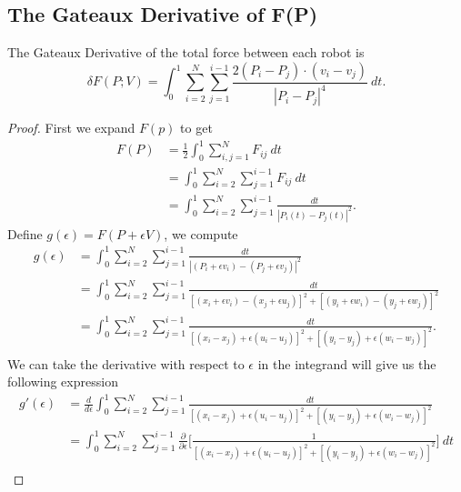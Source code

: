 \subsection{The Gateaux Derivative of F(P)}

\begin{prop}
    The Gateaux Derivative of the total force between each robot is
    \[  \delta F(P;V) = \int_{0}^{1} \sum_{i=2}^{N} \sum_{j=1}^{i-1} \frac{2(P_i - P_j) \cdot (v_i - v_j)}{| P_i - P_j|^4} \ dt. \]
\end{prop}

\begin{proof}
First we expand \( F(p)  \) to get
\begin{align*}
    F(P) &= \frac{ 1 }{ 2 }  \int_{ 0 }^{ 1 } \sum_{ i,j = 1  }^{ N } F_{ij} \ dt \\
         &= \int_{ 0 }^{ 1 } \sum_{ i=2 }^{ N } \sum_{ j=1 }^{ i-1 } F_{ij} \ dt \\
         &= \int_{ 0 }^{ 1 } \sum_{ i=2 }^{ N } \sum_{ j=1 }^{ i-1 } \frac{ dt }{ | P_{i}(t) - P_{j }(t) |^{2}  }.
\end{align*}
Define \( g(\epsilon ) = F(P+\epsilon V)  \), we compute 
\begin{align*}
    g(\epsilon )&= \int_{ 0 }^{ 1 } \sum_{ i=2 }^{ N }\sum_{ j=1 }^{ i-1 } \frac{ dt }{ | (P_{i} + \epsilon v_{i} ) - (P_{j } + \epsilon v_{j }) | ^{2} } \\
                &= \int_{ 0 }^{ 1 } \sum_{ i=2 }^{ N } \sum_{ j=1 }^{ i-1 } \frac{ dt }{ [(x_{i} + \epsilon v_{i}) - (x_{j } + \epsilon u_{j} )]^{2} + [(y_{i} + \epsilon w_{i} ) - (y_{j} + \epsilon w_{j})]^{2}}   \\
                &= \int_{ 0 }^{ 1 } \sum_{ i=2 }^{ N } \sum_{ j=1 }^{ i-1 } \frac{ dt }{ [(x_{i} - x_{j }) + \epsilon (u_{i} - u_{j })]^{2} + [(y_{i} - y_{j}) + \epsilon (w_{i} - w_{j})]^{2}  }. \\
\end{align*}
We can take the derivative with respect to \( \epsilon  \) in the integrand will give us the following expression
\begin{align*}
    g'(\epsilon )&= \frac{ d }{ d \epsilon  }  \int_{ 0 }^{ 1 }  \sum_{ i=2 }^{ N } \sum_{ j=1 }^{ i-1 } \frac{ dt }{ [(x_{i} - x_{j}  ) + \epsilon (u_{i} - u_{j} )]^{2} + [(y_{i} - y_{j} ) + \epsilon (w_{i} - w_{j})]^{2} } \\
                 &= \int_{ 0 }^{ 1 } \sum_{ i=2 }^{ N } \sum_{ j=1 }^{ i-1 }    
    \frac{\partial  }{\partial \epsilon  }  \Bigg[ \frac{ 1 }{ [(x_{i } - x_{j}) + \epsilon (u_{i} - u_{j})]^{2} + [(y_{i} - y_{j}) + \epsilon (w_{i} - w_{j})]^{2} } \Bigg]  \ dt \\

\end{align*}
\end{proof}
